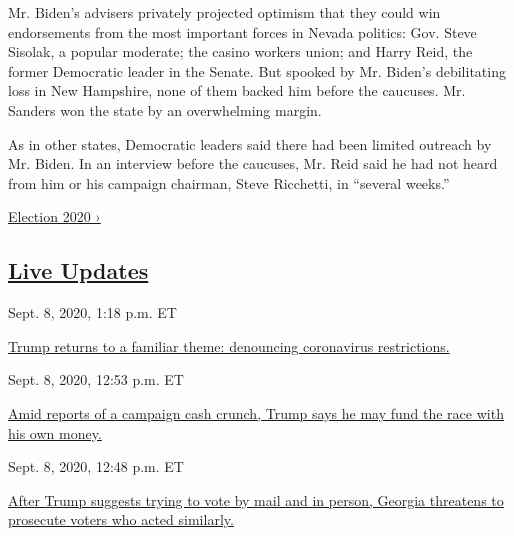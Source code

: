 Mr. Biden's advisers privately projected optimism that they could win
endorsements from the most important forces in Nevada politics: Gov.
Steve Sisolak, a popular moderate; the casino workers union; and Harry
Reid, the former Democratic leader in the Senate. But spooked by Mr.
Biden's debilitating loss in New Hampshire, none of them backed him
before the caucuses. Mr. Sanders won the state by an overwhelming
margin.

As in other states, Democratic leaders said there had been limited
outreach by Mr. Biden. In an interview before the caucuses, Mr. Reid
said he had not heard from him or his campaign chairman, Steve
Ricchetti, in ``several weeks.''

\href{https://www.nytimes3xbfgragh.onion/news-event/2020-election}{Election
2020 ›}

\hypertarget{live-updates}{%
\subsection{\texorpdfstring{\href{https://www.nytimes3xbfgragh.onion/live/2020/09/08/us/trump-vs-biden}{Live
Updates}}{Live Updates}}\label{live-updates}}

\href{https://www.nytimes3xbfgragh.onion/live/2020/09/08/us/trump-vs-biden\#trump-returns-to-a-familiar-theme-denouncing-coronavirus-restrictions}{}

Sept. 8, 2020, 1:18 p.m. ET

\href{https://www.nytimes3xbfgragh.onion/live/2020/09/08/us/trump-vs-biden\#trump-returns-to-a-familiar-theme-denouncing-coronavirus-restrictions}{Trump
returns to a familiar theme: denouncing coronavirus
restrictions.}\href{https://www.nytimes3xbfgragh.onion/live/2020/09/08/us/trump-vs-biden\#amid-reports-of-a-campaign-cash-crunch-trump-says-he-may-fund-the-race-with-his-own-money}{}

Sept. 8, 2020, 12:53 p.m. ET

\href{https://www.nytimes3xbfgragh.onion/live/2020/09/08/us/trump-vs-biden\#amid-reports-of-a-campaign-cash-crunch-trump-says-he-may-fund-the-race-with-his-own-money}{Amid
reports of a campaign cash crunch, Trump says he may fund the race with
his own
money.}\href{https://www.nytimes3xbfgragh.onion/live/2020/09/08/us/trump-vs-biden\#after-trump-suggests-trying-to-vote-by-mail-and-in-person-georgia-threatens-to-prosecute-voters-who-acted-similarly}{}

Sept. 8, 2020, 12:48 p.m. ET

\href{https://www.nytimes3xbfgragh.onion/live/2020/09/08/us/trump-vs-biden\#after-trump-suggests-trying-to-vote-by-mail-and-in-person-georgia-threatens-to-prosecute-voters-who-acted-similarly}{After
Trump suggests trying to vote by mail and in person, Georgia threatens
to prosecute voters who acted similarly.}

